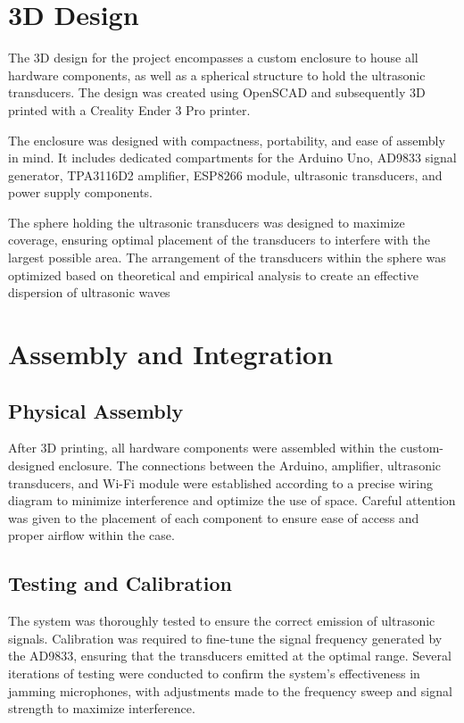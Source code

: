 \section{3D Design}

The 3D design for the project encompasses a custom enclosure to house all hardware components, as well as a spherical structure to hold the ultrasonic transducers. The design was created using OpenSCAD and subsequently 3D printed with a Creality Ender 3 Pro printer.

The enclosure was designed with compactness, portability, and ease of assembly in mind. It includes dedicated compartments for the Arduino Uno, AD9833 signal generator, TPA3116D2 amplifier, ESP8266 module, ultrasonic transducers, and power supply components.

The sphere holding the ultrasonic transducers was designed to maximize coverage, ensuring optimal placement of the transducers to interfere with the largest possible area. The arrangement of the transducers within the sphere was optimized based on theoretical and empirical analysis to create an effective dispersion of ultrasonic waves

\section{Assembly and Integration}

\subsection{Physical Assembly} After 3D printing, all hardware components were assembled within the custom-designed enclosure. The connections between the Arduino, amplifier, ultrasonic transducers, and Wi-Fi module were established according to a precise wiring diagram to minimize interference and optimize the use of space. Careful attention was given to the placement of each component to ensure ease of access and proper airflow within the case.

\subsection{Testing and Calibration} The system was thoroughly tested to ensure the correct emission of ultrasonic signals. Calibration was required to fine-tune the signal frequency generated by the AD9833, ensuring that the transducers emitted at the optimal range. Several iterations of testing were conducted to confirm the system's effectiveness in jamming microphones, with adjustments made to the frequency sweep and signal strength to maximize interference.